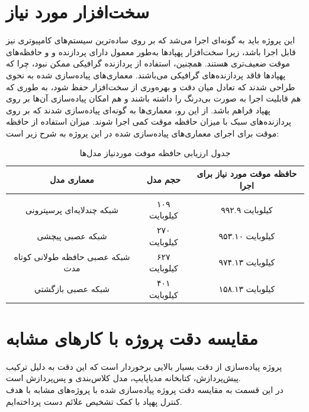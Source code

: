\section{سخت‌افزار مورد نیاز}
این پروژه باید به گونه‌ای اجرا می‌شد که بر روی ساده‌ترین سیستم‌های کامپیوتری نیز قابل اجرا باشد، زیرا سخت‌افزار پهپادها به‌طور معمول دارای پردازنده‌ و و حافظه‌های موقت 
ضعیف‌تری هستند. همچنین، استفاده از پردازنده گرافیکی ممکن نبود، چرا که پهپادها فاقد پردازنده‌های گرافیکی می‌باشند. 
معماری‌های پیاده‌سازی شده به نحوی طراحی شدند که تعادل میان دقت و بهره‌وری از سخت‌افزار حفظ شود، به طوری که هم قابلیت اجرا به صورت بی‌درنگ را داشته باشند و هم امکان پیاده‌سازی آن‌ها بر روی پهپاد فراهم باشد. از این رو، معماری‌ها به گونه‌ای پیاده‌سازی شدند که بر روی پردازنده‌های سبک با میزان حافظه موقت کمی اجرا شوند.
میزان استفاده از حافظه موقت برای اجرای معماری‌های پیاده‌سازی شده در این پروژه به شرح زیر است:



\begin{table}[h!]
    \centering
    \begin{tabular}{||c c c||}
     \hline
     \rule{0pt}{3ex}معماری مدل & حجم مدل & حافظه موقت مورد نیاز برای اجرا \\ [1.5ex]
     \hline
     \hline
     \rule{0pt}{0.5ex} & & \\  %
     شبکه چندلایه‌ای پرسپترونی & ۱۰۹ کیلوبایت & ۹۹۲.۹ کیلوبایت \\ [2.5ex]
     شبکه عصبی پیچشی & ۲۷۰ کیلوبایت & ۹۵۳.۱۰ کیلوبایت \\ [2.5ex]
     شبکه عصبی  حافظه طولانی کوتاه مدت & ۶۲۷ کیلوبایت & ۹۷۴.۱۳ کیلوبایت \\ [2.5ex]
     شبکه عصبی بازگشتي & ۴۰۱ کیلوبایت & ۱۵۸.۱۳ کیلوبایت \\ [2.5ex]
     \hline
    \end{tabular}
    \caption{جدول ارزیابی حافظه موفت موردنیاز مدل‌ها}
    \label{table:4}
\end{table}

\section{مقایسه دقت پروژه با کارهای مشابه}
پروژه پیاده‌سازی از دقت بسیار بالایی برخوردار است که این دقت به دلیل ترکیب پیش‌پردازش، کتابخانه مدیاپایپ، مدل کلاس‌بندی و پس‌پردازش است. 
\\ در این قسمت به مقایسه دقت پروژه پیاده‌سازی شده با پروژه‌های مشابه با هدف کنترل پهپاد با کمک تشخیص علائم دست پرداخته‌ایم.

